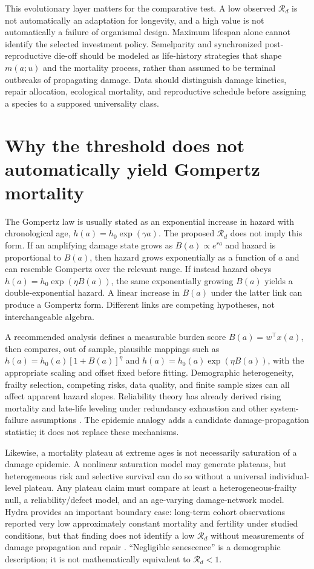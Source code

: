 \documentclass[11pt,a4paper]{article}
\newcommand{\Rd}{\mathcal{R}_{d}}
\begin{document}
This evolutionary layer matters for the comparative test. A low observed $\Rd$ is not automatically an adaptation for longevity, and a high value is not automatically a failure of organismal design. Maximum lifespan alone cannot identify the selected investment policy. Semelparity and synchronized post-reproductive die-off should be modeled as life-history strategies that shape $m(a;u)$ and the mortality process, rather than assumed to be terminal outbreaks of propagating damage. Data should distinguish damage kinetics, repair allocation, ecological mortality, and reproductive schedule before assigning a species to a supposed universality class.

\section{Why the threshold does not automatically yield Gompertz mortality}
The Gompertz law is usually stated as an exponential increase in hazard with chronological age, $h(a)=h_0\exp(\gamma a)$. The proposed $\Rd$ does not imply this form. If an amplifying damage state grows as $B(a)\propto e^{ra}$ and hazard is proportional to $B(a)$, then hazard grows exponentially as a function of $a$ and can resemble Gompertz over the relevant range. If instead hazard obeys $h(a)=h_0\exp(\eta B(a))$, the same exponentially growing $B(a)$ yields a double-exponential hazard. A linear increase in $B(a)$ under the latter link can produce a Gompertz form. Different links are competing hypotheses, not interchangeable algebra.

A recommended analysis defines a measurable burden score $B(a)=w^\top x(a)$, then compares, out of sample, plausible mappings such as $h(a)=h_0(a)[1+B(a)]^\eta$ and $h(a)=h_0(a)\exp(\eta B(a))$, with the appropriate scaling and offset fixed before fitting. Demographic heterogeneity, frailty selection, competing risks, data quality, and finite sample sizes can all affect apparent hazard slopes. Reliability theory has already derived rising mortality and late-life leveling under redundancy exhaustion and other system-failure assumptions \citep{gavrilov2001,gavrilov2004}. The epidemic analogy adds a candidate damage-propagation statistic; it does not replace these mechanisms.

Likewise, a mortality plateau at extreme ages is not necessarily saturation of a damage epidemic. A nonlinear saturation model may generate plateaus, but heterogeneous risk and selective survival can do so without a universal individual-level plateau. Any plateau claim must compare at least a heterogeneous-frailty null, a reliability/defect model, and an age-varying damage-network model. Hydra provides an important boundary case: long-term cohort observations reported very low approximately constant mortality and fertility under studied conditions, but that finding does not identify a low $\Rd$ without measurements of damage propagation and repair \citep{schaible2015}. “Negligible senescence” is a demographic description; it is not mathematically equivalent to $\Rd<1$.
\end{document}
